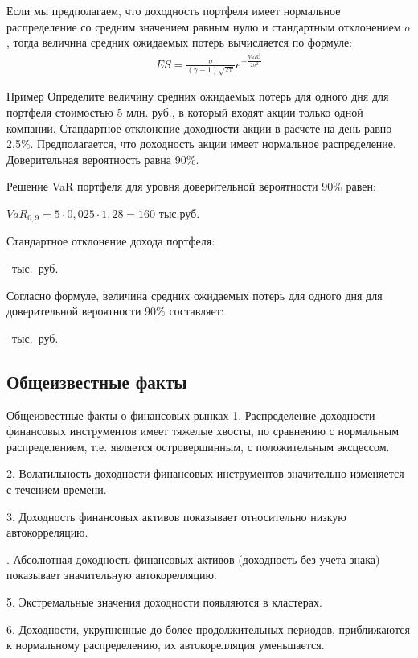 \documentclass[_fin_decisions_lectures.tex]{subfiles}
\begin{document}
\begin{frame}
Если мы предполагаем, что доходность портфеля имеет нормальное распределение со средним значением равным нулю и стандартным отклонением $\sigma$, тогда величина средних ожидаемых потерь вычисляется по формуле:
\begin{align}
\label{es_normal}
ES=\frac{\sigma}{(\gamma-1)\sqrt{2\pi}}e^{-\frac{VaR_{\gamma}^2}{2\sigma^2}}
\end{align}

\end{frame}
\begin{frame}
\begin{exampleblock}{Пример}
Определите величину средних ожидаемых потерь для одного дня для портфеля стоимостью 5 млн. руб., в который входят акции только одной компании. Стандартное отклонение доходности акции в расчете на день равно 2,5\%. Предполагается, что доходность акции имеет нормальное распределение. Доверительная вероятность равна 90\%.
\end{exampleblock}
\end{frame}
\begin{frame}
\begin{exampleblock}{Решение}
VaR портфеля для уровня доверительной вероятности 90\% равен:

$VaR_{0,9}=5\cdot 0,025\cdot 1,28=160 \text{ тыс.руб.}$

Стандартное отклонение дохода портфеля: 

~тыс.~руб.

Согласно формуле, величина средних ожидаемых потерь для одного дня для доверительной вероятности 90\% составляет: 

~тыс.~руб.
\end{exampleblock}
\end{frame}
\subsection{Общеизвестные факты}
\begin{frame}[allowframebreaks]{Общеизвестные факты о финансовых рынках}
1. Распределение доходности финансовых инструментов имеет тяжелые хвосты, по сравнению с нормальным распределением, т.е. является островершинным, с положительным эксцессом.

2. Волатильность доходности финансовых инструментов значительно изменяется с течением времени.

3. Доходность финансовых активов показывает относительно низкую автокорреляцию.

. Абсолютная доходность финансовых активов (доходность без учета знака) показывает значительную автокорелляцию.

5. Экстремальные значения доходности появляются в кластерах.


6. Доходности, укрупненные до более продолжительных периодов, приближаются к нормальному распределению, их автокорелляция уменьшается.
\end{frame}
\end{document}
